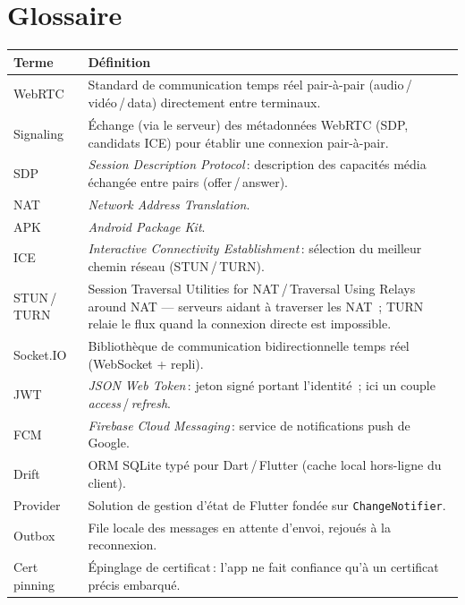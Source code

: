 \documentclass[11pt,a4paper,oneside]{report}
\newcommand{\thd}[1]{\textbf{\textcolor{AlanyaIndigoDark}{#1}}}
\begin{document}
\section{Glossaire}
\begin{tabularx}{\linewidth}{@{}l X@{}}
\toprule
\thd{Terme} & \thd{D\'{e}finition}\\
\midrule
WebRTC   & Standard de communication temps r\'{e}el pair-\`{a}-pair (audio\,/\,vid\'{e}o\,/\,data) directement entre terminaux.\\
Signaling & \'{E}change (via le serveur) des m\'{e}tadonn\'{e}es WebRTC (SDP, candidats ICE) pour \'{e}tablir une connexion pair-\`{a}-pair.\\
SDP      & \emph{Session Description Protocol}\,: description des capacit\'{e}s m\'{e}dia \'{e}chang\'{e}e entre pairs (offer\,/\,answer).\\
NAT      & \emph{Network Address Translation}.\\
APK      & \emph{Android Package Kit}.\\
ICE      & \emph{Interactive Connectivity Establishment}\,: s\'{e}lection du meilleur chemin r\'{e}seau (STUN\,/\,TURN).\\
STUN\,/\,TURN & Session Traversal Utilities for NAT\,/\,Traversal Using Relays around NAT --- serveurs aidant \`{a} traverser les NAT~; TURN relaie le flux quand la connexion directe est impossible.\\
Socket.IO & Biblioth\`{e}que de communication bidirectionnelle temps r\'{e}el (WebSocket + repli).\\
JWT      & \emph{JSON Web Token}\,: jeton sign\'{e} portant l'identit\'{e}~; ici un couple \emph{access}\,/\,\emph{refresh}.\\
FCM      & \emph{Firebase Cloud Messaging}\,: service de notifications push de Google.\\
Drift    & ORM SQLite typ\'{e} pour Dart\,/\,Flutter (cache local hors-ligne du client).\\
Provider & Solution de gestion d'\'{e}tat de Flutter fond\'{e}e sur \texttt{ChangeNotifier}.\\
Outbox   & File locale des messages en attente d'envoi, rejou\'{e}s \`{a} la reconnexion.\\
Cert pinning & \'{E}pinglage de certificat\,: l'app ne fait confiance qu'\`{a} un certificat pr\'{e}cis embarqu\'{e}.\\
\bottomrule
\end{tabularx}

\end{document}
